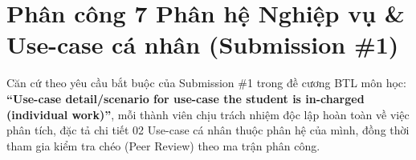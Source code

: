\documentclass[11pt,a4paper]{article}
\begin{document}
\section{Phân công 7 Phân hệ Nghiệp vụ \& Use-case cá nhân (Submission \#1)}

Căn cứ theo yêu cầu bắt buộc của Submission \#1 trong đề cương BTL môn học: \textbf{``Use-case detail/scenario for use-case the student is in-charged (individual work)''}, mỗi thành viên chịu trách nhiệm độc lập hoàn toàn về việc phân tích, đặc tả chi tiết 02 Use-case cá nhân thuộc phân hệ của mình, đồng thời tham gia kiểm tra chéo (Peer Review) theo ma trận phân công.

\vspace{4pt}
\end{document}
